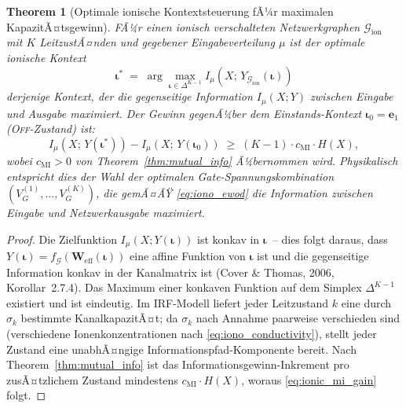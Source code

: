 ﻿\documentclass[12pt, a4paper, openany]{report}
\newtheorem{theorem}{Theorem}[chapter]
\newcommand{\calG}{\mathcal{G}}
\begin{document}
\begin{theorem}[Optimale ionische Kontextsteuerung fÃ¼r maximalen KapazitÃ¤tsgewinn]
\label{thm:ionic_optimal_context}
FÃ¼r einen ionisch verschalteten Netzwerkgraphen $\calG_{\mathrm{ion}}$
mit $K$ LeitzustÃ¤nden und gegebener Eingabeverteilung $\mu$ ist der
optimale ionische Kontext
\begin{equation}
  \label{eq:ionic_optimal}
  \bm{\iota}^*
  \;=\; \arg\max_{\bm{\iota} \in \Delta^{K-1}} I_\mu(X;\, Y_{\calG_{\mathrm{ion}}}(\bm{\iota}))
\end{equation}
derjenige Kontext, der die gegenseitige Information $I_\mu(X; Y)$ zwischen
Eingabe und Ausgabe maximiert.  Der Gewinn gegenÃ¼ber dem
Einstands-Kontext $\bm{\iota}_0 = \bm{e}_1$ (\textsc{Off}-Zustand) ist:
\begin{equation}
  \label{eq:ionic_mi_gain}
  I_\mu(X;\, Y(\bm{\iota}^*)) - I_\mu(X;\, Y(\bm{\iota}_0))
  \;\geq\;
  (K-1)\cdot c_{\mathrm{MI}} \cdot H(X),
\end{equation}
wobei $c_{\mathrm{MI}} > 0$ von Theorem~\ref{thm:mutual_info} Ã¼bernommen wird.
Physikalisch entspricht dies der Wahl der optimalen Gate-Spannungs\-kombination
$(V_G^{(1)}, \ldots, V_G^{(K)})$, die gemÃ¤ÃŸ \eqref{eq:iono_ewod} die
Information zwischen Eingabe und Netzwerkausgabe maximiert.
\end{theorem}

\begin{proof}
Die Zielfunktion $I_\mu(X; Y(\bm{\iota}))$ ist konkav in $\bm{\iota}$~--
dies folgt daraus, dass $Y(\bm{\iota}) = f_{\calG}(\bm{W}_{\mathrm{eff}}(\bm{\iota}))$
eine affine Funktion von $\bm{\iota}$ ist und die gegenseitige Information
konkav in der Kanalmatrix ist (Cover \& Thomas, 2006, Korollar~2.7.4).
Das Maximum einer konkaven Funktion auf dem Simplex $\Delta^{K-1}$ existiert
und ist eindeutig.  Im IRF-Modell liefert jeder Leitzustand $k$ eine durch
$\sigma_k$ bestimmte KanalkapazitÃ¤t; da $\sigma_k$ nach Annahme paarweise
verschieden sind (verschiedene Ionenkonzentrationen nach
\eqref{eq:iono_conductivity}), stellt jeder Zustand eine unabhÃ¤ngige
Informationspfad-Komponente bereit.  Nach Theorem~\ref{thm:mutual_info}
ist das Informationsgewinn-Inkrement pro zusÃ¤tzlichem Zustand mindestens
$c_{\mathrm{MI}} \cdot H(X)$, woraus \eqref{eq:ionic_mi_gain} folgt.
\end{proof}
\end{document}
